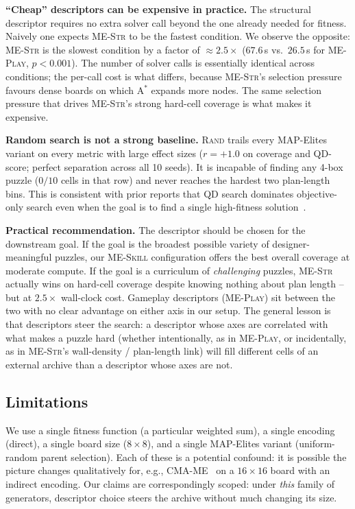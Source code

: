 \documentclass[conference]{IEEEtran}
\begin{document}
\textbf{``Cheap'' descriptors can be expensive in practice.} The
structural descriptor requires no extra solver call beyond the one
already needed for fitness. Naively one expects \textsc{ME-Str} to
be the fastest condition. We observe the opposite: \textsc{ME-Str}
is the slowest condition by a factor of $\approx 2.5\times$
($67.6$\,s vs.\ $26.5$\,s for \textsc{ME-Play}, $p < 0.001$). The
number of solver calls is essentially identical across conditions;
the per-call cost is what differs, because \textsc{ME-Str}'s
selection pressure favours dense boards on which A$^*$ expands more
nodes. The same selection pressure that drives \textsc{ME-Str}'s
strong hard-cell coverage is what makes it expensive.

\textbf{Random search is not a strong baseline.} \textsc{Rand}
trails every MAP-Elites variant on every metric with large effect
sizes ($r = +1.0$ on coverage and QD-score; perfect separation
across all 10 seeds). It is incapable of finding any 4-box puzzle
($0/10$ cells in that row) and never reaches the hardest two
plan-length bins. This is consistent with prior reports
that QD search dominates objective-only search even when the goal
is to find a single high-fitness
solution~\cite{mouret2015illuminating, gravina2019pcgsurvey}.

\textbf{Practical recommendation.} The descriptor should be chosen
for the downstream goal. If the goal is the broadest possible
variety of designer-meaningful puzzles, our \textsc{ME-Skill}
configuration offers the best overall coverage at moderate compute.
If the goal is a curriculum of \emph{challenging} puzzles,
\textsc{ME-Str} actually wins on hard-cell coverage despite knowing
nothing about plan length -- but at $2.5\times$ wall-clock cost.
Gameplay descriptors (\textsc{ME-Play}) sit between the two with no
clear advantage on either axis in our setup. The general lesson is
that descriptors steer the search: a descriptor whose axes are
correlated with what makes a puzzle hard (whether intentionally,
as in \textsc{ME-Play}, or incidentally, as in \textsc{ME-Str}'s
wall-density / plan-length link) will fill different cells of an
external archive than a descriptor whose axes are not.

\subsection{Limitations}

We use a single fitness function (a particular weighted sum), a
single encoding (direct), a single board size ($8 \times 8$), and a
single MAP-Elites variant (uniform-random parent selection). Each of
these is a potential confound: it is possible the picture changes
qualitatively for, e.g., CMA-ME~\cite{fontaine2020cma} on a $16
\times 16$ board with an indirect encoding. Our claims are
correspondingly scoped: under \emph{this} family of generators,
descriptor choice steers the archive without much changing its
size.
\end{document}
